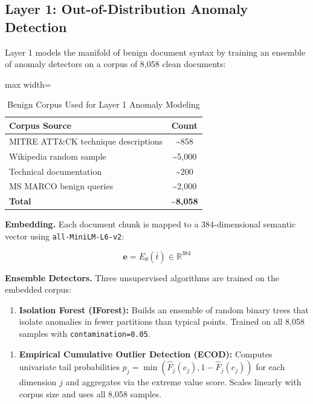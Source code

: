 \documentclass[conference]{IEEEtran}
\begin{document}
\subsection{Layer 1: Out-of-Distribution Anomaly Detection}

Layer 1 models the manifold of benign document syntax by training an ensemble of anomaly detectors on a corpus of 8,058 clean documents:


\begin{table}[!t]
\centering
\caption{Benign Corpus Used for Layer 1 Anomaly Modeling}
\label{tab:2}
\scriptsize
\begin{adjustbox}{max width=\columnwidth}
\begin{tabular}{lc}
\toprule
Corpus Source & Count \\
\midrule
MITRE ATT\&CK technique descriptions & \textasciitilde{}858 \\
Wikipedia random sample & \textasciitilde{}5,000 \\
Technical documentation & \textasciitilde{}200 \\
MS MARCO benign queries & \textasciitilde{}2,000 \\
\textbf{Total} & \textbf{\textasciitilde{}8,058} \\
\bottomrule
\end{tabular}
\end{adjustbox}
\end{table}


\textbf{Embedding.} Each document chunk is mapped to a 384-dimensional semantic vector using \texttt{all-MiniLM-L6-v2}:


$$\mathbf{e} = E_{\theta}(\bar{t}) \in \mathbb{R}^{384}$$


\textbf{Ensemble Detectors.} Three unsupervised algorithms are trained on the embedded corpus:


\begin{enumerate}
\item \textbf{Isolation Forest (IForest):} Builds an ensemble of random binary trees that isolate anomalies in fewer partitions than typical points. Trained on all 8,058 samples with \texttt{contamination=0.05}.
\end{enumerate}

\begin{enumerate}
\item \textbf{Empirical Cumulative Outlier Detection (ECOD):} Computes univariate tail probabilities $p_j = \min(\hat{F}_j(e_j), 1 - \hat{F}_j(e_j))$ for each dimension $j$ and aggregates via the extreme value score. Scales linearly with corpus size and uses all 8,058 samples.
\end{enumerate}
\end{document}

